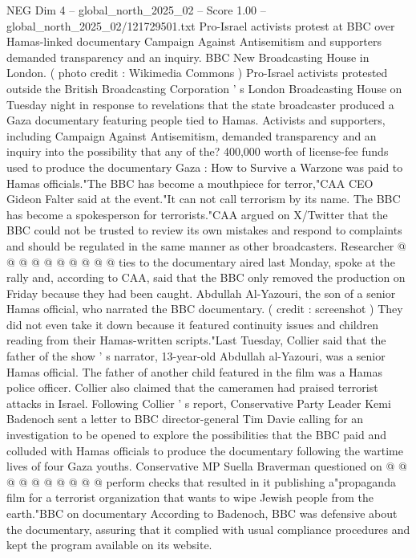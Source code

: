 \begin{textsample}{NEG Dim 4 – global\_north\_2025\_02 – Score 1.00 – global\_north\_2025\_02/121729501.txt}  \label{ex:f4_neg_409}
Pro-Israel activists protest at BBC over Hamas-linked documentary Campaign Against Antisemitism and supporters demanded transparency and an inquiry.
BBC New Broadcasting House in London. ( photo credit : Wikimedia Commons ) Pro-Israel activists protested outside the British Broadcasting Corporation ' s London Broadcasting House on Tuesday night in response to revelations that the state broadcaster produced a Gaza documentary featuring people tied to Hamas.
Activists and supporters, including Campaign Against Antisemitism, demanded transparency and an inquiry into the possibility that any of the? 400,000 worth of license-fee funds used to produce the documentary Gaza : How to Survive a Warzone was paid to Hamas officials."The BBC has become a mouthpiece for terror,"CAA CEO Gideon Falter said at the event."It can not call terrorism by its name.
The BBC has become a spokesperson for terrorists."CAA argued on X/Twitter that the BBC could not be trusted to review its own mistakes and respond to complaints and should be regulated in the same manner as other broadcasters.
Researcher @ @ @ @ @ @ @ @ @ @ ties to the documentary aired last Monday, spoke at the rally and, according to CAA, said that the BBC only removed the production on Friday because they had been caught.
Abdullah Al-Yazouri, the son of a senior Hamas official, who narrated the BBC documentary. ( credit : screenshot ) They did not even take it down because it featured continuity issues and children reading from their Hamas-written scripts."Last Tuesday, Collier said that the father of the show ' s narrator, 13-year-old Abdullah al-Yazouri, was a senior Hamas official.
The father of another child featured in the film was a Hamas police officer.
Collier also claimed that the cameramen had praised terrorist attacks in Israel.
Following Collier ' s report, Conservative Party Leader Kemi Badenoch sent a letter to BBC director-general Tim Davie calling for an investigation to be opened to explore the possibilities that the BBC paid and colluded with Hamas officials to produce the documentary following the wartime lives of four Gaza youths.
Conservative MP Suella Braverman questioned on @ @ @ @ @ @ @ @ @ @ perform checks that resulted in it publishing a"propaganda film for a terrorist organization that wants to wipe Jewish people from the earth."BBC on documentary According to Badenoch, BBC was defensive about the documentary, assuring that it complied with usual compliance procedures and kept the program available on its website.

\end{textsample}
